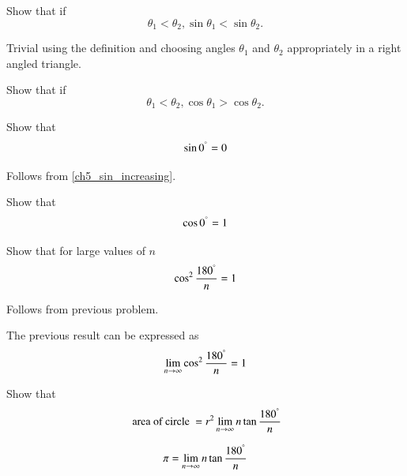 \begin{problem}
	Show that if
\begin{equation}
\label{ch5_sin_increasing}
\theta_1 < \theta_2, \sin \theta_1 < \sin \theta_2.
\end{equation}	
\end{problem}
\proof Trivial using the definition and choosing angles $\theta_1$ and $\theta_2$ appropriately in a right angled triangle.
%
	\begin{problem}
		Show that if
		\begin{equation}
		\label{ch5_sin_increasing}
		\theta_1 < \theta_2, \cos \theta_1 > \cos \theta_2.
		\end{equation}	
	\end{problem}
\begin{problem}
	Show that 
	\begin{equation}
	\label{ch5_sin_zero}
	\sin 0^{\degree} = 0
	\end{equation}
\end{problem}
\proof Follows from \eqref{ch5_sin_increasing}.
%
\begin{problem}
	Show that 
	\begin{equation}
	\label{ch5_sin_zero}
	\cos 0^{\degree} = 1
	\end{equation}
	\end{problem}
%
%
\begin{problem}
	Show that for large values of $n$
	\begin{equation}
\cos^2\frac{180^{\degree}}{n} = 1
%
	\end{equation}	
\end{problem}
%
\proof  Follows from previous problem.
%
\begin{definition}
	The previous result can be expressed as
%
\begin{equation}
\lim_{n \rightarrow \infty}\cos^2\frac{180^{\degree}}{n} = 1
\end{equation}
%	
\end{definition}
\begin{problem}
	Show that 
\begin{equation}
\text{ area of circle } = r^2\lim_{n \rightarrow \infty}
{n\tan\frac{180^{\degree}}{n}} 
\end{equation}	
\end{problem}
%
\begin{definition}
	\begin{equation}
	\pi = \lim_{n \rightarrow \infty}
	{n\tan\frac{180^{\degree}}{n}}
	\end{equation}
\end{definition}
